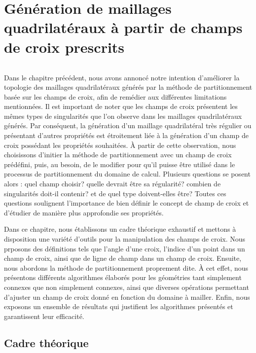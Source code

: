 \chapter{Génération de maillages quadrilatéraux à partir de champs de croix prescrits}
\label{chap:theoritical}
\minitoc

\[\]

Dans le chapitre précédent, nous avons annoncé notre intention d'améliorer la topologie des maillages quadrilatéraux générés par la méthode de partitionnement basée sur les champs de croix, afin de remédier aux différentes limitations mentionnées. Il est important de noter que les champs de croix présentent les mêmes types de singularités que l'on observe dans les maillages quadrilatéraux générés. Par conséquent, la génération d'un maillage quadrilatéral très régulier ou présentant d'autres propriétés est étroitement liée à la génération d'un champ de croix possédant les propriétés souhaitées. À partir de cette observation, nous choisissons d'initier la méthode de partitionnement avec un champ de croix prédéfini, puis, au besoin, de le modifier pour qu'il puisse être utilisé dans le processus de partitionnement du domaine de calcul. Plusieurs questions se posent alors : quel champ choisir? quelle devrait être sa régularité? combien de singularités doit-il contenir? et de quel type doivent-elles être? Toutes ces questions soulignent l'importance de bien définir le concept de champ de croix et d'étudier de manière plus approfondie ses propriétés.

Dans ce chapitre, nous établissons un cadre théorique exhaustif et mettons à disposition une variété d'outils pour la manipulation des champs de croix. Nous prposons des définitions tels que l'angle d'une croix, l'indice d'un point dans un champ de croix, ainsi que de ligne de champ dans un champ de croix. Ensuite, nous abordons la méthode de partitionnement proprement dite. À cet effet, nous présentons différents algorithmes élaborés pour les géométries tant simplement connexes que non simplement connexes, ainsi que diverses opérations permettant d'ajuster un champ de croix donné en fonction du domaine à mailler. Enfin, nous exposons un ensemble de résultats qui justifient les algorithmes présentés et garantissent leur efficacité.



\section{Cadre théorique}

